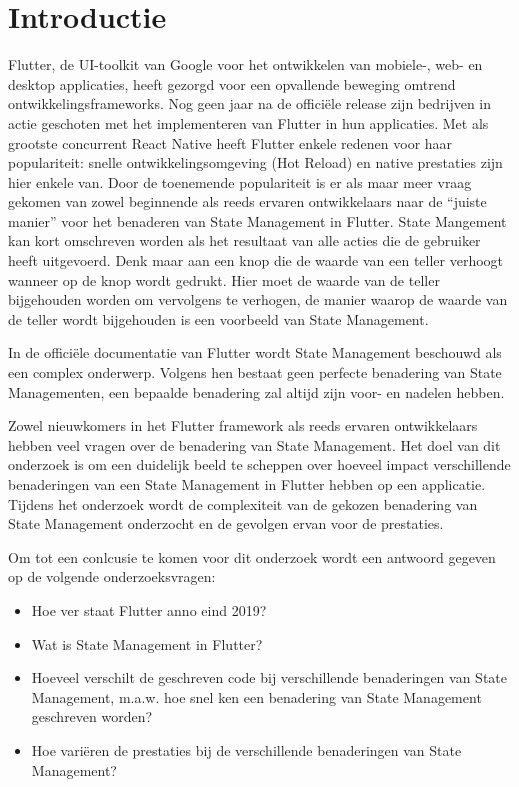 
\section{Introductie} %
\label{sec:introductie}

Flutter, de UI-toolkit van Google voor het ontwikkelen van mobiele-, web- en desktop applicaties,
heeft gezorgd voor een opvallende beweging omtrend ontwikkelingsframeworks.
Nog geen jaar na de officiële release zijn bedrijven in actie geschoten met het implementeren van Flutter
in hun applicaties.
Met als grootste concurrent React Native heeft Flutter enkele redenen voor haar populariteit: snelle ontwikkelingsomgeving (Hot Reload) en native prestaties zijn hier enkele van.
Door de toenemende populariteit is er als maar meer vraag gekomen van zowel beginnende als
reeds ervaren ontwikkelaars naar de ``juiste manier'' voor het benaderen van State Management in Flutter.
State Mangement kan kort omschreven worden als het resultaat van alle acties die de gebruiker heeft
uitgevoerd.
Denk maar aan een knop die de waarde van een teller verhoogt wanneer op de knop wordt gedrukt. Hier moet de waarde van de teller bijgehouden worden om vervolgens te verhogen, de manier waarop de waarde van de teller wordt bijgehouden is een voorbeeld van State Management.

In de officiële documentatie van Flutter wordt State Management beschouwd als een complex onderwerp. Volgens hen bestaat geen perfecte benadering van State Managementen, een bepaalde benadering zal altijd zijn voor- en nadelen hebben.

Zowel nieuwkomers in het Flutter framework als reeds ervaren ontwikkelaars hebben 
veel vragen over de benadering van State Management.
Het doel van dit onderzoek is om een duidelijk beeld te scheppen over hoeveel impact
verschillende benaderingen van een State Management in Flutter hebben op een applicatie.
Tijdens het onderzoek wordt de complexiteit van de gekozen benadering van State Management  onderzocht en de gevolgen ervan voor de prestaties.

Om tot een conlcusie te komen voor dit onderzoek wordt een antwoord gegeven op de volgende onderzoeksvragen:
\begin{itemize}
    \item Hoe ver staat Flutter anno eind 2019?
    \item Wat is State Management in Flutter?
    \item Hoeveel verschilt de geschreven code bij verschillende benaderingen van State Management, m.a.w. hoe snel 
    ken een benadering van State Management geschreven worden?
    \item Hoe variëren de prestaties bij de verschillende benaderingen van State Management?
\end{itemize}
    
